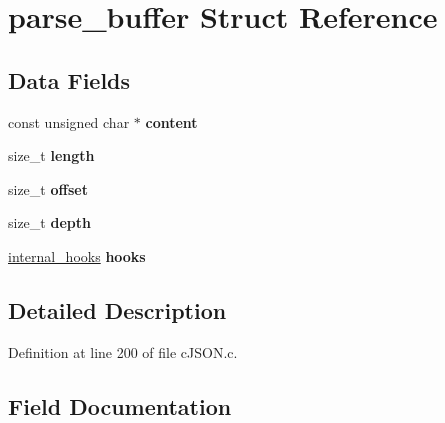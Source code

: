 \hypertarget{structparse__buffer}{}\section{parse\+\_\+buffer Struct Reference}
\label{structparse__buffer}
\subsection*{Data Fields}
\begin{DoxyCompactItemize}
\item 
\mbox{\label{structparse__buffer_a52ee1184576baa3d5171059ab0e942de}} 
const unsigned char $\ast$ {\bfseries content}
\item 
\mbox{\label{structparse__buffer_a036970e9335896d3cee8459eda9e2eb9}} 
size\+\_\+t {\bfseries length}
\item 
\mbox{\label{structparse__buffer_af727920073077579942a79de519bb31a}} 
size\+\_\+t {\bfseries offset}
\item 
\mbox{\label{structparse__buffer_af613c4ed7d73f76c60c50d1bcf4c67a0}} 
size\+\_\+t {\bfseries depth}
\item 
\mbox{\label{structparse__buffer_a2c3e99b15da2935fc5d58124ffb4a894}} 
\hyperlink{structinternal__hooks}{internal\+\_\+hooks} {\bfseries hooks}
\end{DoxyCompactItemize}


\subsection{Detailed Description}


Definition at line 200 of file c\+J\+S\+O\+N.\+c.



\subsection{Field Documentation}
\mbox{\label{structparse__buffer_a52ee1184576baa3d5171059ab0e942de}} 
